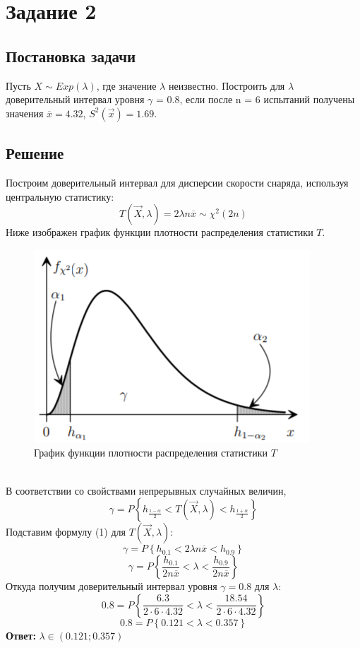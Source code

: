 \section*{Задание 2}
\subsection*{Постановка задачи}
Пусть $X \sim Exp (\lambda)$, где значение $\lambda$ неизвестно. Построить для $\lambda$ доверительный интервал
уровня $\gamma $ = 0.8, если после n = 6 испытаний получены значения $\overline{x}=4.32$, $S^2 (\overrightarrow{x}) = 1.69$.
\subsection*{Решение}
Построим доверительный интервал для дисперсии скорости снаряда, используя центральную статистику:
\begin{equation}
T(\vec{X}, \lambda) = 2\lambda n \overline{x} \sim \chi^2(2n)
\end{equation}
Ниже изображен график функции плотности распределения статистики $T$. 
\begin{figure}[h!]
	\caption{График функции плотности распределения статистики $T$}
	\center \includegraphics{img/1.png}
\end{figure}\\
В соответствии со свойствами непрерывных случайных величин,
\begin{equation}
\gamma = P\left\{ h_{\frac{1-\alpha}{2}} < T(\vec{X}, \lambda) < h_{\frac{1+\alpha}{2}}\right\}
\end{equation}
Подставим формулу (1) для $T(\vec{X}, \lambda)$:
\begin{equation}
\gamma = P\left\{ h_{0.1} <2\lambda n \overline{x} < h_{0.9}\right\}
\end{equation}
\begin{equation}
\gamma = P\left\{ \frac{h_{0.1}}{2n\overline{x}} < \lambda < \frac{h_{0.9}}{2n\overline{x}}\right\}
\end{equation}
Откуда получим  доверительный интервал уровня $\gamma = 0.8$ для  $\lambda$:
\begin{equation}
0.8 = P\left\{ \frac{6.3}{2\cdot 6 \cdot 4.32} < \lambda <\frac{18.54}{2\cdot 6 \cdot 4.32}\right\}
\end{equation}
\begin{equation}
0.8 = P\left\{ 0.121 < \lambda <0.357\right\}
\end{equation}
\textbf{Ответ:} $\lambda \in (0.121;0.357)$ 